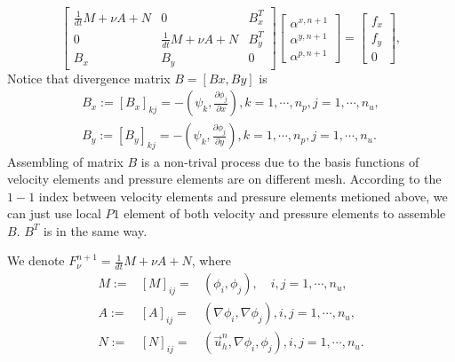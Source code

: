\documentclass{eajam}
\begin{document}
  \begin{equation}
    \left[
      \begin{array}{lll}
        \frac{1}{dt} M + \nu A + N & 0 & B_x^T \\
        0 & \frac{1}{dt} M +\nu A + N  & B_y^T \\
        B_x & B_y & 0
      \end{array}
    \right]
    \left[
      \begin{array}{c}
        \alpha^{x, n + 1} \\
        \alpha^{y, n + 1} \\
        \alpha^{p, n + 1}
      \end{array}
    \right] = 
    \left[
      \begin{array}{c}
        f_x \\
        f_y \\
        0
      \end{array}
    \right],
    \label{eq::linear_system}
  \end{equation} 
  Notice that divergence matrix $B = [Bx, By]$ is 
  \begin{eqnarray}
    B_x := [B_x]_{kj} = -\left(\psi_k, \frac{\partial \phi_j}{\partial
        x} \right), k = 1, \cdots, n_p, j = 1, \cdots, n_u, \\
    B_y := [B_y]_{kj} = -\left(\psi_k, \frac{\partial \phi_j}{\partial
        y} \right), k = 1, \cdots, n_p, j = 1, \cdots, n_u.
  \end{eqnarray}
  Assembling of matrix $B$ is a non-trival process due to the
  basis functions of velocity elements and pressure elements are on 
  different mesh. According to the $1-1$ index between velocity
  elements and pressure elements metioned above, we can just use local
  $P1$ element of both velocity and pressure elements to assemble $B$.
  $B^T$ is in the same way.
  
  We denote $F_\nu^{n + 1} = \frac{1}{dt} M + \nu A + N$, where
  \begin{eqnarray}
    M := &[M]_{ij} =& \left( \phi_i, \phi_j \right),\quad  i,j = 1, \cdots,
    n_u, \\
    A := &[A]_{ij} =& \left( \nabla \phi_i, \nabla \phi_j \right), i,j =
    1, \cdots, n_u, \\
    N := &[N]_{ij} =& \left(\vec{u}_h^n, \nabla \phi_i, \phi_j \right),
    i,j = 1, \cdots, n_u.
  \end{eqnarray}
  
\end{document}
